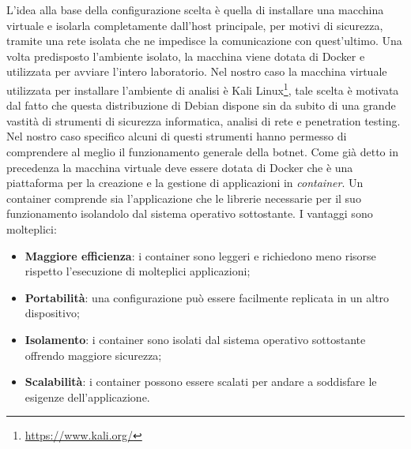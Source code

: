 L’idea alla base della configurazione scelta è quella di installare una macchina virtuale e isolarla completamente dall’host principale, per motivi di sicurezza, tramite una rete isolata che ne impedisce la comunicazione con quest'ultimo. Una volta predisposto l’ambiente isolato, la macchina viene dotata di Docker e utilizzata per avviare l’intero laboratorio. Nel nostro caso la macchina virtuale utilizzata per installare l'ambiente di analisi è Kali Linux\footnote{\url{https://www.kali.org/}}, tale scelta è motivata dal fatto che questa distribuzione di Debian dispone sin da subito di una grande vastità di strumenti di sicurezza informatica, analisi di rete e penetration testing.  Nel nostro caso specifico alcuni di questi strumenti hanno permesso di comprendere al meglio il funzionamento generale della botnet. 
Come già detto in precedenza la macchina virtuale deve essere dotata di Docker che è una piattaforma per la creazione e la gestione di applicazioni in \emph{container}. Un container comprende sia l'applicazione che le librerie necessarie per il suo funzionamento isolandolo dal sistema operativo sottostante. I vantaggi sono molteplici:
\begin{itemize}
    \item \textbf{Maggiore efficienza}: i container sono leggeri e richiedono meno risorse rispetto l'esecuzione di molteplici applicazioni;
    \item \textbf{Portabilità}: una configurazione può essere facilmente replicata in un altro dispositivo;
    \item \textbf{Isolamento}: i container sono isolati dal sistema operativo sottostante offrendo maggiore sicurezza;
    \item \textbf{Scalabilità}: i container possono essere scalati per andare a soddisfare le esigenze dell'applicazione.
\end{itemize}

